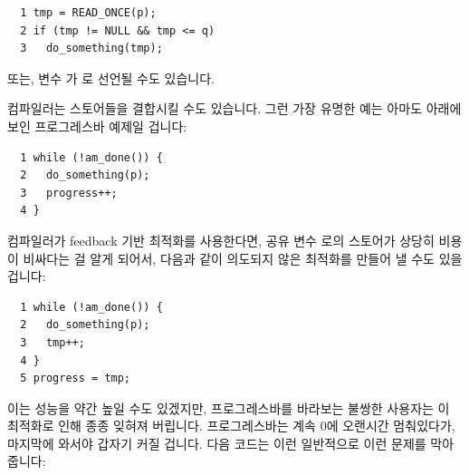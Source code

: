 \vspace{5pt}
\begin{minipage}[t]{\columnwidth}
\scriptsize
\begin{verbatim}
  1 tmp = READ_ONCE(p);
  2 if (tmp != NULL && tmp <= q)
  3   do_something(tmp);
\end{verbatim}
\end{minipage}
\vspace{5pt}

또는, 변수  가  로 선언될 수도 있습니다.

컴파일러는 스토어들을 결합시킬 수도 있습니다.
그런 가장 유명한 예는 아마도 아래에 보인 프로그레스바 예제일 겁니다:

\vspace{5pt}
\begin{minipage}[t]{\columnwidth}
\scriptsize
\begin{verbatim}
  1 while (!am_done()) {
  2   do_something(p);
  3   progress++;
  4 }
\end{verbatim}
\end{minipage}
\vspace{5pt}

컴파일러가 feedback 기반 최적화를 사용한다면, 공유 변수  로의
스토어가 상당히 비용이 비싸다는 걸 알게 되어서, 다음과 같이 의도되지 않은
최적화를 만들어 낼 수도 있을 겁니다:

\vspace{5pt}
\begin{minipage}[t]{\columnwidth}
\scriptsize
\begin{verbatim}
  1 while (!am_done()) {
  2   do_something(p);
  3   tmp++;
  4 }
  5 progress = tmp;
\end{verbatim}
\end{minipage}
\vspace{5pt}

이는 성능을 약간 높일 수도 있겠지만, 프로그레스바를 바라보는 불쌍한 사용자는 이
최적화로 인해 종종 잊혀져 버립니다.
프로그레스바는 계속 0에 오랜시간 멈춰있다가, 마지막에 와서야 갑자기 커질
겁니다.
다음 코드는 이런 일반적으로 이런 문제를 막아줍니다:
\iffalse


